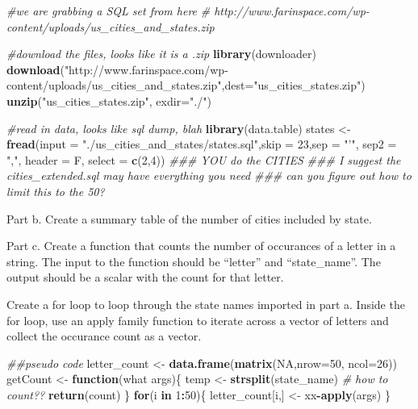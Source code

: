 \documentclass[]{article}
\newenvironment{Shaded}{\begin{snugshade}}{\end{snugshade}}
\newcommand{\CommentTok}[1]{\textcolor[rgb]{0.56,0.35,0.01}{\textit{#1}}}
\newcommand{\ControlFlowTok}[1]{\textcolor[rgb]{0.13,0.29,0.53}{\textbf{#1}}}
\newcommand{\DataTypeTok}[1]{\textcolor[rgb]{0.13,0.29,0.53}{#1}}
\newcommand{\DecValTok}[1]{\textcolor[rgb]{0.00,0.00,0.81}{#1}}
\newcommand{\KeywordTok}[1]{\textcolor[rgb]{0.13,0.29,0.53}{\textbf{#1}}}
\newcommand{\NormalTok}[1]{#1}
\newcommand{\OperatorTok}[1]{\textcolor[rgb]{0.81,0.36,0.00}{\textbf{#1}}}
\newcommand{\OtherTok}[1]{\textcolor[rgb]{0.56,0.35,0.01}{#1}}
\newcommand{\StringTok}[1]{\textcolor[rgb]{0.31,0.60,0.02}{#1}}
\begin{document}
\begin{Shaded}
\begin{Highlighting}[]
    \CommentTok{#we are grabbing a SQL set from here}
    \CommentTok{# http://www.farinspace.com/wp-content/uploads/us_cities_and_states.zip}

    \CommentTok{#download the files, looks like it is a .zip}
    \KeywordTok{library}\NormalTok{(downloader)}
    \KeywordTok{download}\NormalTok{(}\StringTok{"http://www.farinspace.com/wp-content/uploads/us_cities_and_states.zip"}\NormalTok{,}\DataTypeTok{dest=}\StringTok{"us_cities_states.zip"}\NormalTok{)}
    \KeywordTok{unzip}\NormalTok{(}\StringTok{"us_cities_states.zip"}\NormalTok{, }\DataTypeTok{exdir=}\StringTok{"./"}\NormalTok{)}
    
    \CommentTok{#read in data, looks like sql dump, blah}
    \KeywordTok{library}\NormalTok{(data.table)}
\NormalTok{    states <-}\StringTok{ }\KeywordTok{fread}\NormalTok{(}\DataTypeTok{input =} \StringTok{"./us_cities_and_states/states.sql"}\NormalTok{,}\DataTypeTok{skip =} \DecValTok{23}\NormalTok{,}\DataTypeTok{sep =} \StringTok{"'"}\NormalTok{, }\DataTypeTok{sep2 =} \StringTok{","}\NormalTok{, }\DataTypeTok{header =}\NormalTok{ F, }\DataTypeTok{select =} \KeywordTok{c}\NormalTok{(}\DecValTok{2}\NormalTok{,}\DecValTok{4}\NormalTok{))}
    \CommentTok{### YOU do the CITIES}
    \CommentTok{### I suggest the cities_extended.sql may have everything you need}
    \CommentTok{### can you figure out how to limit this to the 50?}
\end{Highlighting}
\end{Shaded}

Part b. Create a summary table of the number of cities included by
state.

Part c. Create a function that counts the number of occurances of a
letter in a string. The input to the function should be ``letter'' and
``state\_name''. The output should be a scalar with the count for that
letter.

Create a for loop to loop through the state names imported in part a.
Inside the for loop, use an apply family function to iterate across a
vector of letters and collect the occurance count as a vector.

\begin{Shaded}
\begin{Highlighting}[]
    \CommentTok{##pseudo code}
\NormalTok{    letter_count <-}\StringTok{ }\KeywordTok{data.frame}\NormalTok{(}\KeywordTok{matrix}\NormalTok{(}\OtherTok{NA}\NormalTok{,}\DataTypeTok{nrow=}\DecValTok{50}\NormalTok{, }\DataTypeTok{ncol=}\DecValTok{26}\NormalTok{))}
\NormalTok{    getCount <-}\StringTok{ }\ControlFlowTok{function}\NormalTok{(what args)\{}
\NormalTok{        temp <-}\StringTok{ }\KeywordTok{strsplit}\NormalTok{(state_name)}
        \CommentTok{# how to count??}
        \KeywordTok{return}\NormalTok{(count)}
\NormalTok{    \}}
    \ControlFlowTok{for}\NormalTok{(i }\ControlFlowTok{in} \DecValTok{1}\OperatorTok{:}\DecValTok{50}\NormalTok{)\{}
\NormalTok{        letter_count[i,] <-}\StringTok{ }\NormalTok{xx}\OperatorTok{-}\KeywordTok{apply}\NormalTok{(args)}
\NormalTok{    \}}
\end{Highlighting}
\end{Shaded}
\end{document}
